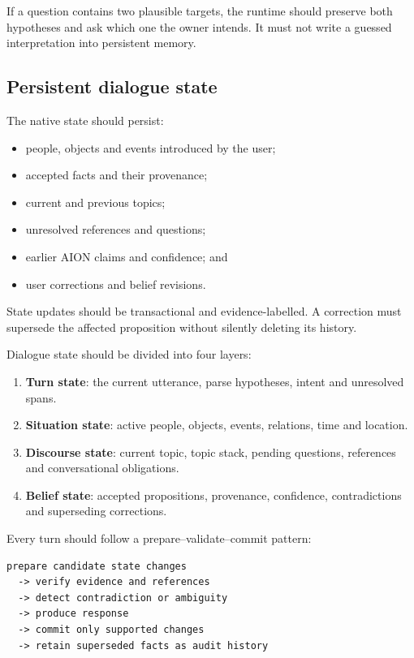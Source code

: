 \documentclass[11pt,a4paper]{article}
\begin{document}
If a question contains two plausible targets, the runtime should preserve both hypotheses and ask
which one the owner intends.  It must not write a guessed interpretation into persistent memory.

\subsection{Persistent dialogue state}

The native state should persist:

\begin{itemize}
  \item people, objects and events introduced by the user;
  \item accepted facts and their provenance;
  \item current and previous topics;
  \item unresolved references and questions;
  \item earlier AION claims and confidence; and
  \item user corrections and belief revisions.
\end{itemize}

State updates should be transactional and evidence-labelled.  A correction must supersede the
affected proposition without silently deleting its history.

Dialogue state should be divided into four layers:

\begin{enumerate}
  \item \textbf{Turn state}: the current utterance, parse hypotheses, intent and unresolved spans.
  \item \textbf{Situation state}: active people, objects, events, relations, time and location.
  \item \textbf{Discourse state}: current topic, topic stack, pending questions, references and
        conversational obligations.
  \item \textbf{Belief state}: accepted propositions, provenance, confidence, contradictions and
        superseding corrections.
\end{enumerate}

Every turn should follow a prepare--validate--commit pattern:

\begin{lstlisting}
prepare candidate state changes
  -> verify evidence and references
  -> detect contradiction or ambiguity
  -> produce response
  -> commit only supported changes
  -> retain superseded facts as audit history
\end{lstlisting}
\end{document}
